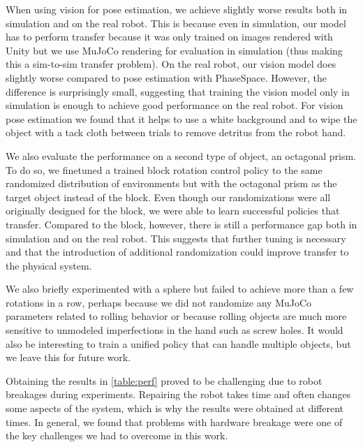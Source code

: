 When using vision for pose estimation, we achieve slightly worse results both in simulation and on the real robot. This is because even in simulation, our model has to perform transfer because it was only trained on images rendered with Unity but we use MuJoCo rendering for evaluation in simulation (thus making this a sim-to-sim transfer problem).
On the real robot, our vision model does slightly worse compared to pose estimation with PhaseSpace. However, the difference is surprisingly small, suggesting that training the vision model only in simulation is enough to achieve good performance on the real robot.
For vision pose estimation we found that it helps to use a white background and to wipe the object with a tack cloth between trials to remove detritus from the robot hand.

We also evaluate the performance on a second type of object, an octagonal prism.
To do so, we finetuned a trained block rotation control policy to the same randomized distribution of environments but with the octagonal prism as the target object instead of the block.
Even though our randomizations were all originally designed for the block, we were able to learn successful policies that transfer.
Compared to the block, however, there is still a performance gap both in simulation and on the real robot.
This suggests that further tuning is necessary and that the introduction of additional randomization could improve transfer to the physical system.

We also briefly experimented with a sphere but failed to achieve more than a few rotations in a row, perhaps
because we did not randomize any MuJoCo parameters related to rolling behavior or because rolling objects are much more sensitive to unmodeled imperfections in the hand such as screw holes.
It would also be interesting to train a unified policy that can handle multiple objects, but we leave this for future work.

Obtaining the results in \autoref{table:perf} proved to be challenging due to robot breakages during experiments.
Repairing the robot takes time and often changes some aspects of the system, which is why the results were obtained at different times.
In general, we found that problems with hardware breakage were one of the key challenges we had to overcome in this work.
















